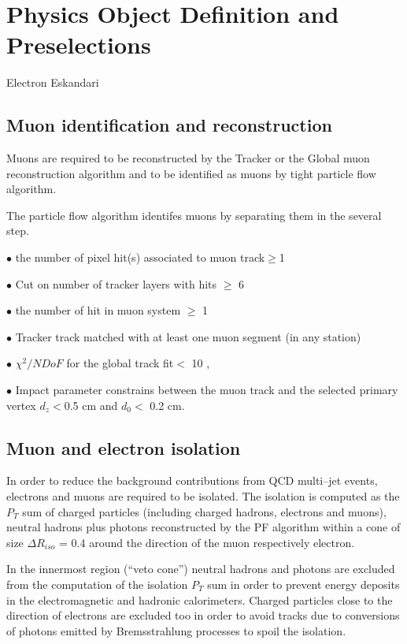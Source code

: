 \section{Physics Object Definition and Preselections}
\label{sect:objdef}

Electron
Eskandari


\subsection{Muon identification and reconstruction}


Muons are required to be reconstructed by the Tracker or the Global muon reconstruction algorithm and to be identified as 
muons by tight particle flow algorithm.

The particle flow algorithm identifes  muons by separating them in the several step.


$\bullet$  the number of pixel hit(s) associated to muon track$\geq $1

$\bullet$  Cut on number of tracker layers with hits $\geq $ 6

$\bullet$ the number of hit in muon system $\geq $ 1

$\bullet$ Tracker track matched with at least one muon segment (in any station)

$\bullet$ $\chi ^{2}/NDoF $ for the global track fit$< $ 10 ,

$\bullet$ Impact parameter constrains between the muon track and the selected primary vertex 
 $d_{z} < $0.5 cm and $d_{0} <$ 0.2 cm.

\subsection{Muon and electron isolation}

In order to reduce the background contributions from QCD multi–jet events, electrons and
muons are required to be isolated. The isolation is computed as the $P_{T}$ sum of charged particles (including charged hadrons, 
electrons and muons), neutral hadrons plus photons reconstructed by the PF algorithm within a cone of size
$\Delta R_{iso}$ = 0.4 around the direction of the muon respectively electron. 


In the innermost region
(``veto cone'') neutral
hadrons and photons  are excluded from the computation of the isolation $P_{T}$ sum in order to prevent energy deposits in the electromagnetic and hadronic
calorimeters. Charged particles close to the direction of electrons  are excluded too in order to avoid tracks due to conversions of photons emitted by Bremsstrahlung processes to spoil the isolation.

